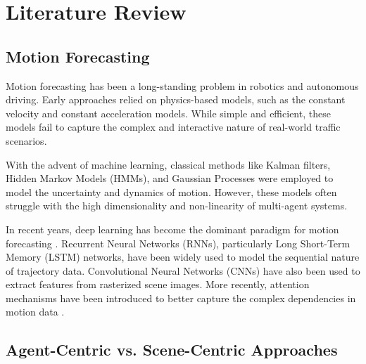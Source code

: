 
\chapter{Literature Review} %

\label{Chapter2} %


\section{Motion Forecasting}

Motion forecasting has been a long-standing problem in robotics and autonomous driving. Early approaches relied on physics-based models, such as the constant velocity and constant acceleration models. While simple and efficient, these models fail to capture the complex and interactive nature of real-world traffic scenarios.

With the advent of machine learning, classical methods like Kalman filters, Hidden Markov Models (HMMs), and Gaussian Processes were employed to model the uncertainty and dynamics of motion. However, these models often struggle with the high dimensionality and non-linearity of multi-agent systems.

In recent years, deep learning has become the dominant paradigm for motion forecasting \citep{Shi2025MotionFF}. Recurrent Neural Networks (RNNs), particularly Long Short-Term Memory (LSTM) networks, have been widely used to model the sequential nature of trajectory data. Convolutional Neural Networks (CNNs) have also been used to extract features from rasterized scene images. More recently, attention mechanisms have been introduced to better capture the complex dependencies in motion data \citep{Mao2021Multi-levelMA, Ding2022DeepLW}.

\section{Agent-Centric vs. Scene-Centric Approaches}

